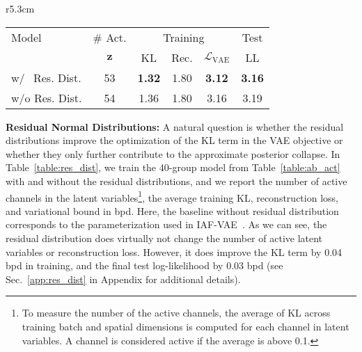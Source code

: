 \documentclass{article}
\newcommand{\z}{{\pmb{z}}}
\renewcommand{\L}{{\mathcal{L}}}
\begin{document}
\begin{wraptable}{r}{5.3cm}
\vspace{-4mm}
\centering
{\footnotesize
\setlength{\tabcolsep}{1pt}
\caption{\small The impact of residual dist.}\label{table:res_dist}
    \begin{tabular}{lccccc}
    \toprule
    Model    & \# Act. & \multicolumn{3}{c}{Training} & Test\\
             &   $\z$   &  KL & Rec. & $\L_{\text{VAE}}$ & LL\\
    \midrule
    w/$\ \ $ Res. Dist.  & 53   &\bf 1.32  & 1.80  & \bf 3.12 & \bf 3.16 \\
    w/o Res. Dist.     & 54   & 1.36  & 1.80  & 3.16 & 3.19 \\
    \bottomrule
    \end{tabular}
}
\vspace{-4mm}
\end{wraptable}\textbf{Residual Normal Distributions:} A natural question is whether the residual distributions improve the optimization of the KL term in the VAE objective or whether they only further contribute to the approximate posterior collapse. In Table~\ref{table:res_dist}, we train the 40-group model from Table~\ref{table:ab_act} with and without the residual distributions, and we report the number of active channels in the latent variables\footnote{To measure the number of the active channels, the average of KL across training batch and spatial dimensions is computed for each channel in latent variables. A channel is considered active if the average is above 0.1.}, the average training KL, reconstruction loss, and variational bound in bpd. Here, the baseline without residual distribution corresponds to the parameterization used in IAF-VAE~\cite{kingma2016improved}. As we can see, the residual distribution does virtually not change the number of active latent variables or reconstruction loss. However, it does improve the KL term by 0.04 bpd in training, and the final test log-likelihood by 0.03 bpd (see Sec.~\ref{app:res_dist} in Appendix for additional details).
\end{document}
